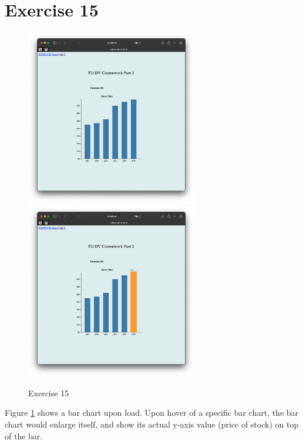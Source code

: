 \documentclass{scrreprt}
\begin{document}
\newpage
\section{Exercise 15}
\begin{figure}[!ht]
    \centering
    \includegraphics[width = 7.5cm]{images/ex15_1.png}
    \includegraphics[width = 7.5cm]{images/ex15_2.png}
    \label{fig:ex15}
    \caption{Exercise 15}
\end{figure}
\FloatBarrier
% 
Figure \ref{fig:ex15} shows a bar chart upon load. Upon hover of a specific bar chart, the bar chart would enlarge itself, and show its actual y-axis value (price of stock) on top of the bar.

\newpage
\end{document}
